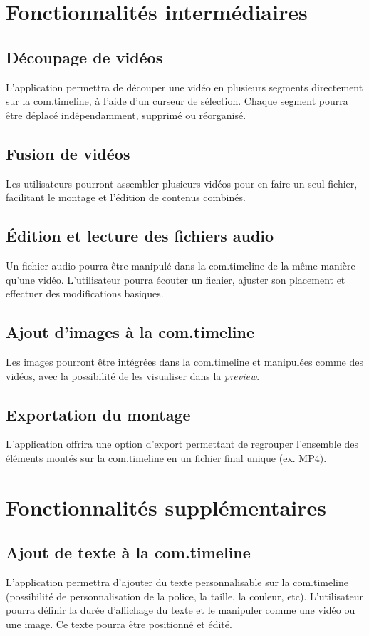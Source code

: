\documentclass{rapport}
\begin{document}
\section{Fonctionnalités intermédiaires}

\subsection{Découpage de vidéos}
L’application permettra de découper une vidéo en plusieurs segments directement sur la com.timeline, à l’aide d’un curseur de sélection. Chaque segment pourra être déplacé indépendamment, supprimé ou réorganisé.

\subsection{Fusion de vidéos}
Les utilisateurs pourront assembler plusieurs vidéos pour en faire un seul fichier, facilitant le montage et l’édition de contenus combinés.

\subsection{Édition et lecture des fichiers audio}
Un fichier audio pourra être manipulé dans la com.timeline de la même manière qu’une vidéo. L’utilisateur pourra écouter un fichier, ajuster son placement et effectuer des modifications basiques.

\subsection{Ajout d’images à la com.timeline}
Les images pourront être intégrées dans la com.timeline et manipulées comme des vidéos, avec la possibilité de les visualiser dans la \textit{preview}.

\subsection{Exportation du montage}
L’application offrira une option d’export permettant de regrouper l’ensemble des éléments montés sur la com.timeline en un fichier final unique (ex. MP4).

\section{Fonctionnalités supplémentaires}
\subsection{Ajout de texte à la com.timeline}
L’application permettra d’ajouter du texte personnalisable sur la com.timeline (possibilité de personnalisation de la police, la taille, la couleur, etc). L’utilisateur pourra définir la durée d’affichage du texte et le manipuler comme une vidéo ou une image. Ce texte pourra être positionné et édité.
\end{document}
